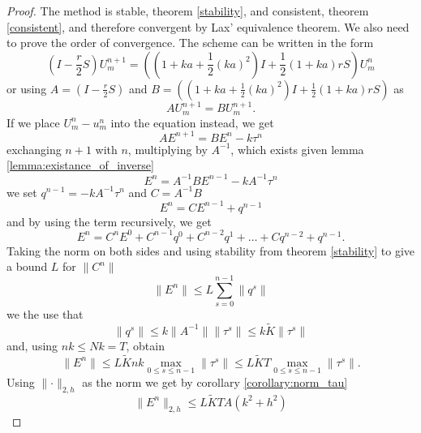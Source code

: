 \begin{proof}
    The method is stable, theorem \ref{stability}, and consistent, theorem \ref{consistent}, and therefore convergent by Lax' equivalence theorem. We also need to prove the order of convergence.
    The scheme can be written in the form
    $$\left(I - \frac{r}{2}S \right)U_{m}^{n+1} = \left( \left(1+ka+\frac{1}{2}(ka)^2\right)I + \frac{1}{2}\left(1+ka\right)rS\right)U_{m}^n$$
    or using $A = \left(I - \frac{r}{2}S \right)$ and $B = \left( \left(1+ka+\frac{1}{2}(ka)^2\right)I + \frac{1}{2}\left(1+ka\right)rS\right)$ as
    $$AU_{m}^{n+1} = BU_{m}^{n+1}.$$
    If we place $U_m^n - u_m^n$ into the equation instead, we get
    $$AE^{n+1} = BE^n - k\tau^n$$
    exchanging $n+1$ with $n$, multiplying by $A^{-1}$, which exists given lemma \ref{lemma:existance_of_inverse}
    $$E^n = A^{-1}BE^{n-1} -kA^{-1}\tau^n$$
    we set $q^{n-1}= -kA^{-1}\tau^n$ and $C=A^{-1}B$
    $$E^n = CE^{n-1}+q^{n-1}$$
    and by using the term recursively, we get
    $$E^n = C^nE^{0}+C^{n-1}q^0 + C^{n-2}q^1 + \dots + C q^{n-2} +  q^{n-1}.$$
    Taking the norm on both sides and using stability from theorem \ref{stability} to give a bound $L$ for $\lVert C^n \lVert$
    $$\lVert E^n\lVert  \leq L\sum_{s=0}^{n-1}\lVert q^s \lVert$$
    we the use that 
    $$\lVert q^s \lVert \leq k \lVert A^{-1} \lVert \lVert\tau^s \lVert \leq k \tilde{K} \lVert\tau^s \lVert$$
    and, using $nk\leq Nk=T$, obtain
    $$\lVert E^n \lVert \leq L \tilde{K}nk \max_{0\leq s \leq n-1} \lVert \tau^s\lVert \leq L \tilde{K}T\max_{0\leq s \leq n-1} \lVert \tau^s\lVert.$$
    Using $\lVert \cdot \lVert_{2, h}$ as the norm we get by corollary \ref{corollary:norm_tau}
    $$\lVert E^n \lVert_{2, h} \leq L \tilde{K}TA(k^2+h^2)$$
\end{proof}


